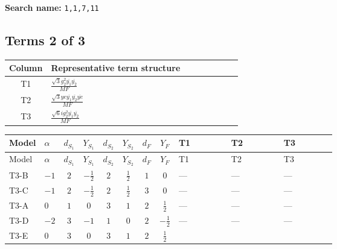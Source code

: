 \documentclass[8pt]{article}
\begin{document}
\begin{landscape}
\begin{longtable}{@{}llcccccc >{\raggedright\arraybackslash}p{0.21\linewidth} >{\raggedright\arraybackslash}p{0.21\linewidth} >{\raggedright\arraybackslash}p{0.21\linewidth}@{}}
\midrule
\bottomrule
\end{longtable}
\clearpage
\noindent\textbf{Search name: }\texttt{1,1,7,11}\par\smallskip
\subsection*{Terms 2 of 3}
\begin{center}
\begin{tabular}{@{}c >{\raggedright\arraybackslash}p{0.82\linewidth}@{}}
\toprule
Column & Representative term structure \\
\midrule
T1 & \(\displaystyle \frac{\sqrt{3} g_{2}^{2} \overline{y_{1}} \overline{y_{2}}}{MF}\) \\
\midrule
T2 & \(\displaystyle \frac{\sqrt{3} ye \overline{y_{1}} \overline{y_{2}} \overline{ye}}{MF}\) \\
\midrule
T3 & \(\displaystyle \frac{\sqrt{6} i g_{2}^{2} \overline{y_{1}} \overline{y_{2}}}{MF}\) \\
\midrule
\bottomrule
\end{tabular}
\end{center}
\smallskip
\tiny
\begin{longtable}{@{}llcccccc >{\raggedright\arraybackslash}p{0.21\linewidth} >{\raggedright\arraybackslash}p{0.21\linewidth} >{\raggedright\arraybackslash}p{0.21\linewidth}@{}}
\toprule
Model & $\alpha$ & $d_{S_1}$ & $Y_{S_1}$ & $d_{S_2}$ & $Y_{S_2}$ & $d_F$ & $Y_F$ & T1 & T2 & T3 \\
\midrule
\endfirsthead
\toprule
Model & $\alpha$ & $d_{S_1}$ & $Y_{S_1}$ & $d_{S_2}$ & $Y_{S_2}$ & $d_F$ & $Y_F$ & T1 & T2 & T3 \\
\midrule
\endhead
T3-B & $-1$ & $2$ & $-\frac{1}{2}$ & $2$ & $\frac{1}{2}$ & $1$ & $0$ & --- & --- & --- \\
\midrule
T3-C & $-1$ & $2$ & $-\frac{1}{2}$ & $2$ & $\frac{1}{2}$ & $3$ & $0$ & --- & --- & --- \\
\midrule
T3-A & $0$ & $1$ & $0$ & $3$ & $1$ & $2$ & $\frac{1}{2}$ & --- & --- & --- \\
\midrule
T3-D & $-2$ & $3$ & $-1$ & $1$ & $0$ & $2$ & $-\frac{1}{2}$ & --- & --- & --- \\
\midrule
T3-E & $0$ & $3$ & $0$ & $3$ & $1$ & $2$ & $\frac{1}{2}$ & \scriptsize\adjustbox{max width=\linewidth}{$\begin{gathered} \frac{49 \sqrt{3} g_{2}^{2} \overline{y_{1}} \overline{y_{2}}}{24 MF}\end{gathered}$} & \scriptsize\adjustbox{max width=\linewidth}{$\begin{gathered} - \frac{\sqrt{3} ye \overline{y_{1}} \overline{y_{2}} \overline{ye}}{12 MF}\end{gathered}$} & \scriptsize\adjustbox{max width=\linewidth}{$\begin{gathered} \frac{\sqrt{6} i g_{2}^{2} \overline{y_{1}} \overline{y_{2}}}{3 MF}\end{gathered}$} \\

\end{longtable}
\end{landscape}
\end{document}
